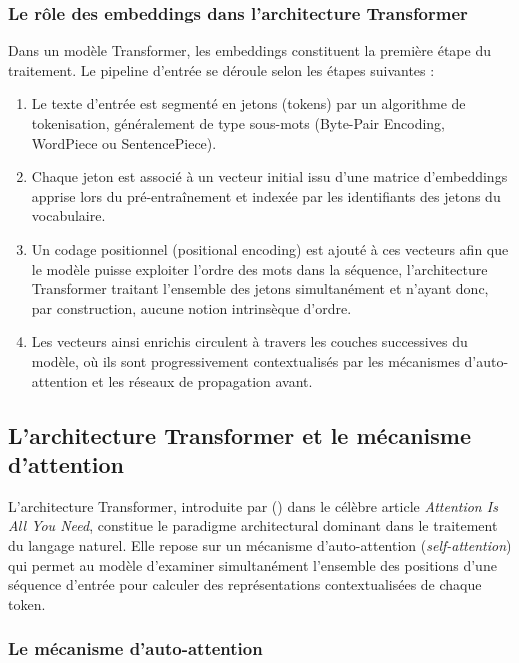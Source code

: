 \documentclass[12pt,twoside]{report}
\begin{document}
\subsubsection{Le rôle des embeddings dans l'architecture Transformer}
Dans un modèle Transformer, les embeddings constituent la première étape du traitement. Le pipeline d'entrée se déroule selon les étapes suivantes :
\begin{enumerate}
    \item Le texte d'entrée est segmenté en jetons (tokens) par un algorithme de tokenisation, généralement de type sous-mots (Byte-Pair Encoding, WordPiece ou SentencePiece).
    \item Chaque jeton est associé à un vecteur initial issu d'une matrice d'embeddings apprise lors du pré-entraînement et indexée par les identifiants des jetons du vocabulaire.
    \item Un codage positionnel (positional encoding) est ajouté à ces vecteurs afin que le modèle puisse exploiter l'ordre des mots dans la séquence, l'architecture Transformer traitant l'ensemble des jetons simultanément et n'ayant donc, par construction, aucune notion intrinsèque d'ordre.
    \item Les vecteurs ainsi enrichis circulent à travers les couches successives du modèle, où ils sont progressivement contextualisés par les mécanismes d'auto-attention et les réseaux de propagation avant.
\end{enumerate} 






\subsection{L'architecture Transformer et le mécanisme d'attention}
 
L'architecture Transformer, introduite par \citeauthor{vaswani2017attention} (\citeyear{vaswani2017attention})
dans le célèbre article \textit{Attention Is All You Need}, constitue le paradigme architectural
dominant dans le traitement du langage naturel. Elle repose sur un mécanisme d'auto-attention
(\textit{self-attention}) qui permet au modèle d'examiner simultanément l'ensemble des positions
d'une séquence d'entrée pour calculer des représentations contextualisées de chaque token.
 
\subsubsection{Le mécanisme d'auto-attention}
 
\end{document}
